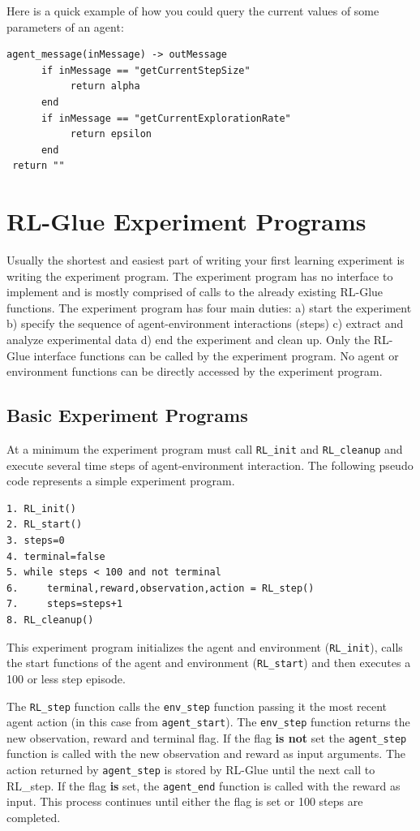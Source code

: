 \documentclass[11pt]{article}
\begin{document}
Here is a quick example of how you could query the current values of some parameters of an agent:
\begin{verbatim}
agent_message(inMessage) -> outMessage
      if inMessage == "getCurrentStepSize"  
           return alpha
      end 
      if inMessage == "getCurrentExplorationRate"  
           return epsilon
      end 
 return ""
\end{verbatim}



\section{RL-Glue Experiment Programs}
\label{exp}
Usually the shortest and easiest part of writing your first learning experiment is writing the experiment program. The experiment program has no interface to implement and is mostly comprised of calls to the already existing RL-Glue functions. The experiment program has four main duties: a) start the experiment b) specify the sequence of agent-environment interactions (steps) c) extract and analyze experimental data d) end the experiment and clean up.  Only the RL-Glue interface functions can be called by the experiment program. No agent or environment functions can be directly accessed by the experiment program.

\subsection{Basic Experiment Programs}
\label{expp1}

At a minimum the experiment program must call \texttt{RL\_init} and \texttt{RL\_cleanup} and execute several time steps of agent-environment interaction. The following pseudo code represents a simple experiment program.
\begin{verbatim}
1. RL_init()
2. RL_start()
3. steps=0
4. terminal=false 
5. while steps < 100 and not terminal
6.     terminal,reward,observation,action = RL_step()
7.     steps=steps+1
8. RL_cleanup()
\end{verbatim}
This experiment program initializes the agent and environment (\texttt{RL\_init}), calls the start functions of the agent and environment (\texttt{RL\_start}) and then executes a 100 or less step episode. 

The \texttt{RL\_step} function calls the \texttt{env\_step} function passing it the most recent agent action (in this case from \texttt{agent\_start}). The \texttt{env\_step} function returns the new observation, reward and terminal flag. If the flag {\bf is not} set the \texttt{agent\_step} function is called with the new observation and reward as input arguments. The action returned by \texttt{agent\_step} is stored by RL-Glue until the next call to RL\_step. If the flag {\bf is} set, the \texttt{agent\_end} function is called with the reward as input. This process continues until either the flag is set or 100 steps are completed. 
\end{document}
